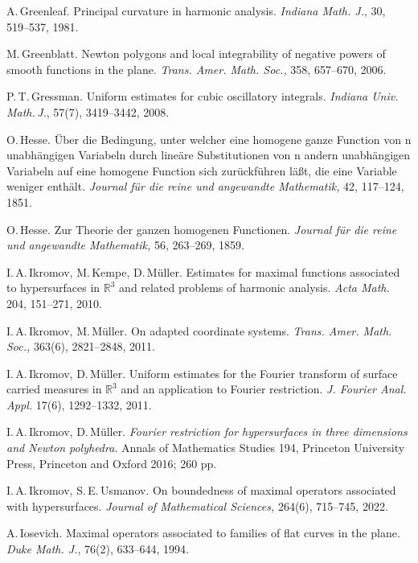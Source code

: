 \documentclass[a4paper, 11pt]{article}
\theoremstyle{plain}
\theoremstyle{definition}
\theoremstyle{lemma}
\theoremstyle{Remark}
\theoremstyle{proposition}
\theoremstyle{corollary}
\theoremstyle{example}
\theoremstyle{assumption}
\begin{document}
\begin{thebibliography}{}
 A.\,Greenleaf. Principal curvature in harmonic analysis. \textit{Indiana Math. J.}, 30, 519--537, 1981.

M.\,Greenblatt. Newton polygons and local integrability of negative powers of smooth
functions in the plane.  \textit{Trans. Amer. Math. Soc.,} 358, 657--670, 2006.

P.\,T.\,Gressman. Uniform estimates for cubic oscillatory integrals. \textit{Indiana Univ.\,Math.\,J.}, 57(7),  3419--3442, 2008.


 O.\,Hesse. \"Uber die Bedingung, unter welcher eine homogene ganze Function von n unabh\"angigen Variabeln durch line\"are Substitutionen von n andern unabh\"angigen Variabeln auf eine homogene Function sich zur\"uckf\"uhren l\"a\ss t, die eine Variable weniger enth\"alt. \textit{Journal f\"ur die reine und angewandte Mathematik,} 42, 117--124, 1851.

 O.\,Hesse. Zur Theorie der ganzen homogenen Functionen.\textit{ Journal f\"ur die reine und angewandte Mathematik,} 56, 263--269, 1859.

 I.\,A.\,Ikromov,  M.\,Kempe,  D.\,M\"uller.  Estimates for maximal functions associated to hypersurfaces
in $\mathbb{R}^3$ and related problems of harmonic analysis. \textit{Acta Math.}  204, 151--271, 2010.


 I.\,A.\,Ikromov, M.\,M\"uller. On adapted coordinate systems. \textit{Trans. Amer.
Math. Soc.,} 363(6), 2821--2848, 2011.

 I.\,A.\,Ikromov, D.\,M\"uller.  Uniform estimates for the Fourier transform of surface carried measures in
$\mathbb{R}^3$ and an application to Fourier restriction. \textit{J. Fourier Anal. Appl.} 17(6), 1292--1332, 2011.

 I.\,A.\,Ikromov,  D.\,M\"uller.
\textit{ Fourier restriction for hypersurfaces in three dimensions and Newton polyhedra}.
   Annals of Mathematics Studies 194, Princeton University Press, Princeton and Oxford 2016; 260 pp.



 I.\,A.\,Ikromov,  S.\,E.\,Usmanov. On boundedness of maximal operators associated with hypersurfaces. \textit{Journal of Mathematical Sciences,} 264(6), 715--745, 2022.

 A.\,Iosevich. Maximal operators associated to families of flat curves in the plane. \textit{Duke Math. J.},
76(2), 633--644,  1994.


\end{thebibliography}
\end{document}
